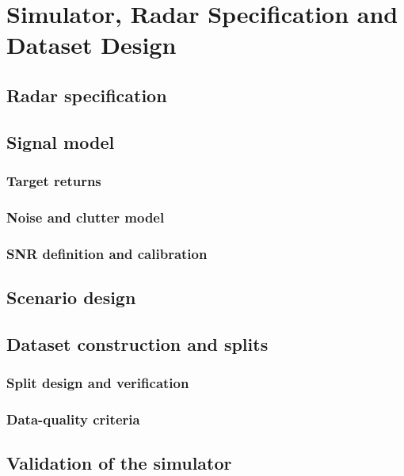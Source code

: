 \chapter{Simulator, Radar Specification and Dataset Design}
\label{ch:simulator}

\section{Radar specification}

\section{Signal model}
\subsection{Target returns}
\subsection{Noise and clutter model}
\subsection{SNR definition and calibration}

\section{Scenario design}

\section{Dataset construction and splits}
\subsection{Split design and verification}
\subsection{Data-quality criteria}

\section{Validation of the simulator}
